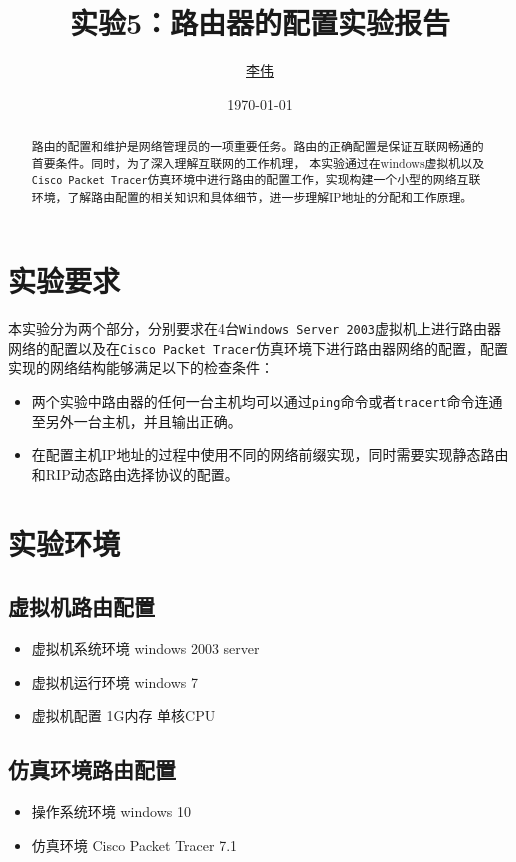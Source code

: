 \documentclass[lang=cn,11pt]{elegantpaper}
\title{实验5：路由器的配置实验报告}
\author{\href{https://github.com/Jack-Lio}{李伟}}
\institute{1711350   计算机科学与技术一班}
\date{\today}
\begin{document}
\maketitle

\begin{abstract}
\noindent 路由的配置和维护是网络管理员的一项重要任务。路由的正确配置是保证互联网畅通的首要条件。同时，为了深入理解互联网的工作机理，
本实验通过在windows虚拟机以及\lstinline{Cisco Packet Tracer}仿真环境中进行路由的配置工作，实现构建一个小型的网络互联环境，了解路由配置的相关知识和具体细节，进一步理解IP地址的分配和工作原理。
\end{abstract}


\section{实验要求}

本实验分为两个部分，分别要求在4台\lstinline{Windows Server 2003}虚拟机上进行路由器网络的配置以及在\lstinline{Cisco Packet Tracer}仿真环境下进行路由器网络的配置，配置实现的网络结构能够满足以下的检查条件：
\begin{itemize}
	\item 两个实验中路由器的任何一台主机均可以通过\lstinline{ping}命令或者\lstinline{tracert}命令连通至另外一台主机，并且输出正确。
	\item 在配置主机IP地址的过程中使用不同的网络前缀实现，同时需要实现静态路由和RIP动态路由选择协议的配置。
\end{itemize}

\section{实验环境}
\subsection{虚拟机路由配置}
\begin{itemize}
	\item 虚拟机系统环境 windows 2003 server
	\item 虚拟机运行环境 windows 7
	\item 虚拟机配置 1G内存 单核CPU
\end{itemize}
\subsection{仿真环境路由配置}
\begin{itemize}
	\item 操作系统环境 windows 10 
	\item 仿真环境 Cisco Packet Tracer 7.1
\end{itemize}
\end{document}
